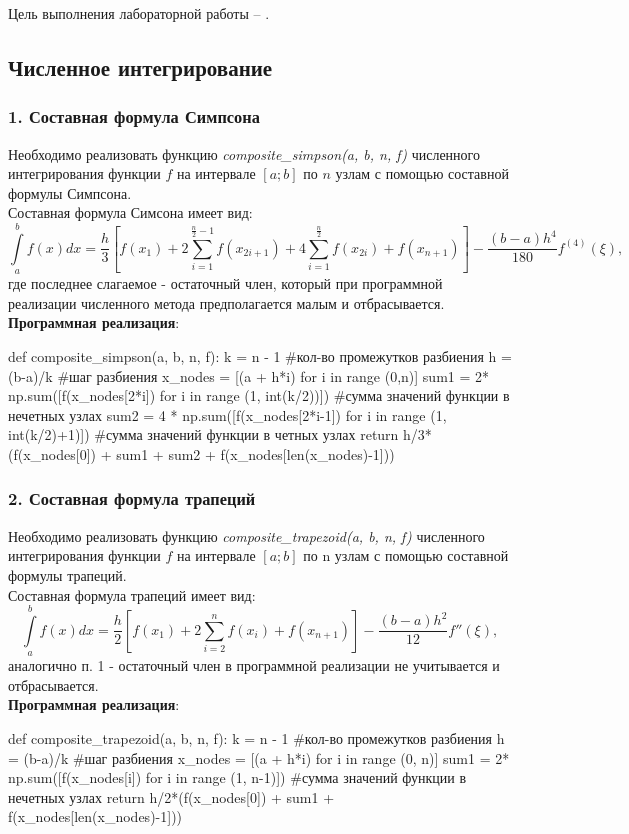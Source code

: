 Цель выполнения лабораторной работы -- \GoalOfResearch.

\subsection{Численное интегрирование}
\subsubsection{1. Составная формула Симпсона}
Необходимо реализовать функцию \textit{composite_simpson(a, b, n, f)} численного интегрирования функции $f$ на интервале $[a; b]$ по $n$ узлам с помощью составной формулы Симпсона. \\
Составная формула Симсона имеет вид: 
\begin{equation*}
    \int\limits_a^bf(x)dx=\frac{h}{3}[f(x_1)+2\sum\limits_{i=1}^{\frac{n}{2}-1}f(x_{2i+1})+4\sum\limits_{i=1}^{\frac{n}{2}}f(x_{2i})+f(x_{n+1})]-\frac{(b-a)h^4}{180}f^(4)(\xi) ,
\end{equation*}
где последнее слагаемое - остаточный член, который при программной реализации численного метода предполагается малым и отбрасывается. \\
\hypertarget{a}{}
\textbf{Программная реализация}:
\begin{python}
def composite_simpson(a, b, n, f):
  k = n - 1 #кол-во промежутков разбиения 
  h = (b-a)/k #шаг разбиения 
  x_nodes = [(a + h*i) for i in range (0,n)]
  sum1 = 2* np.sum([f(x_nodes[2*i]) for i in range (1, int(k/2))]) #сумма значений функции в нечетных узлах 
  sum2 = 4 * np.sum([f(x_nodes[2*i-1]) for i in range (1, int(k/2)+1)]) #сумма значений функции в четных узлах 
  return h/3*(f(x_nodes[0]) + sum1 + sum2 + f(x_nodes[len(x_nodes)-1]))
\end{python}
\subsubsection{2. Составная формула трапеций}
Необходимо реализовать функцию \textit{composite_trapezoid(a, b, n, f)} численного интегрирования функции $f$ на интервале $[a; b]$ по n узлам с помощью составной формулы трапеций. \\
Составная формула трапеций имеет вид: 
\begin{equation*}
    \int\limits_a^bf(x)dx=\frac{h}{2}[f(x_1)+2\sum\limits_{i=2}^{n}f(x_{i})+f(x_{n+1})]-\frac{(b-a)h^2}{12}f''(\xi) ,
\end{equation*}
аналогично п. 1 - остаточный член в программной реализации не учитывается и отбрасывается. \\
\hypertarget{b}{}
\textbf{Программная реализация}:
\begin{python}
def composite_trapezoid(a, b, n, f):
  k = n - 1 #кол-во промежутков разбиения 
  h = (b-a)/k #шаг разбиения 
  x_nodes = [(a + h*i) for i in range (0, n)]
  sum1 = 2* np.sum([f(x_nodes[i]) for i in range (1, n-1)]) #сумма значений функции в нечетных узлах 
  return h/2*(f(x_nodes[0]) + sum1 + f(x_nodes[len(x_nodes)-1]))
\end{python}
